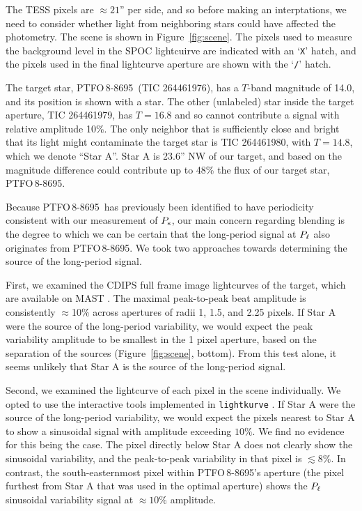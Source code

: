 \documentclass[12pt,twocolumn,tighten]{aastex62}
\newcommand{\ptfo}{PTFO$\,$8-8695}
\begin{document}
The TESS pixels are $\approx21$'' per side, and so before making an
interptations, we need to consider whether light from neighboring
stars could have affected the photometry.  The scene is shown in
Figure~\ref{fig:scene}.  The pixels used to measure the background
level in the SPOC lightcuirve are indicated with an `\texttt{X}'
hatch, and the pixels used in the final lightcurve aperture are shown
with the `\texttt{/}' hatch.

The target star, \ptfo\ (TIC 264461976), has a $T$-band magnitude
of 14.0, and its position is shown with a star.  The other (unlabeled)
star inside the target aperture, TIC 264461979, has $T=16.8$ and so
cannot contribute a signal with relative amplitude 10\%.  The only
neighbor that is sufficiently close and bright that its light might
contaminate the target star is TIC 264461980, with $T=14.8$, which we
denote ``Star A''.  Star A is 23.6'' NW of our target, and based on
the magnitude difference could contribute up to 48\% the flux of our
target star, \ptfo.  

Because \ptfo\ has previously been identified to have periodicity
consistent with our measurement of $P_{\rm s}$, our main concern
regarding blending is the degree to which we can be certain that the
long-period signal at $P_{\rm \ell}$ also originates from \ptfo.
We took two approaches towards determining the source of the
long-period signal.

First, we examined the CDIPS full frame image lightcurves of the
target, which are available on MAST \citep{bouma_cluster_2019}.  The
maximal peak-to-peak beat amplitude is consistently $\approx$10\%
across apertures of radii 1, 1.5, and 2.25 pixels.  If Star A were the
source of the long-period variability, we would expect the peak
variability amplitude to be smallest in the 1 pixel aperture, based on
the separation of the sources (Figure~\ref{fig:scene}, bottom).  From
this test alone, it seems unlikely that Star A is the source of the
long-period signal.

Second, we examined the lightcurve of each pixel in the scene
individually.  We opted to use the interactive tools implemented in
\texttt{lightkurve} \citep{lightkurve_2018}.  If Star A were the
source of the long-period variability, we would expect the pixels
nearest to Star A to show a sinusoidal signal with amplitude exceeding
$10\%$.  We find no evidence for this being the case.  The pixel
directly below Star A does not clearly show the sinusoidal
variability, and the peak-to-peak variability in that pixel is
$\lesssim 8\%$.  In contrast, the south-easternmost pixel within
\ptfo's aperture (the pixel furthest from Star A that was used in the
optimal aperture) shows the $P_{\rm \ell}$ sinusoidal variability
signal at $\approx 10\%$ amplitude.
\end{document}
